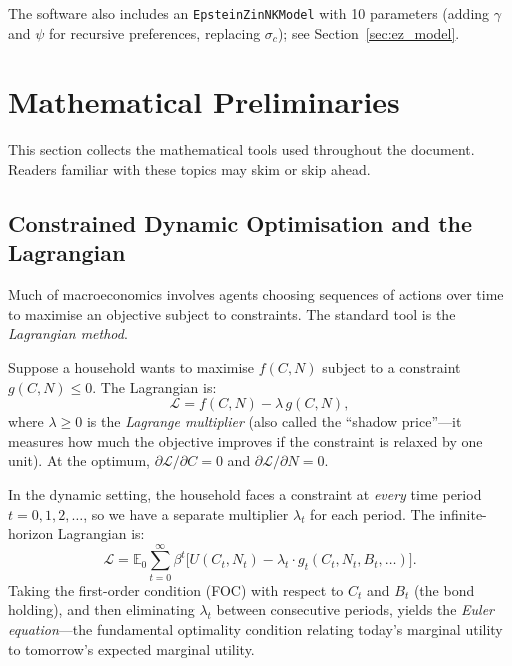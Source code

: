 \documentclass[11pt,a4paper]{article}
\theoremstyle{definition}
\newcommand{\E}{\mathbb{E}}
\newcommand{\code}[1]{\texttt{\color{codecolor}#1}}
\begin{document}
	The software also includes an \code{EpsteinZinNKModel} with 10 parameters (adding $\gamma$ and $\psi$ for recursive preferences, replacing $\sigma_c$); see Section~\ref{sec:ez_model}.
	
	\section{Mathematical Preliminaries}
	\label{sec:math_prelim}
	
	This section collects the mathematical tools used throughout the document.
	Readers familiar with these topics may skim or skip ahead.
	
	\subsection{Constrained Dynamic Optimisation and the Lagrangian}
	\label{sec:lagrangian}
	
	Much of macroeconomics involves agents choosing sequences of actions over time to maximise an objective subject to constraints.
	The standard tool is the \emph{Lagrangian method}.
	
	Suppose a household wants to maximise $f(C, N)$ subject to a constraint $g(C, N) \leq 0$.
	The Lagrangian is:
	\begin{equation}\label{eq:lagrangian}
		\mathcal{L} = f(C, N) - \lambda \, g(C, N),
	\end{equation}
	where $\lambda \geq 0$ is the \emph{Lagrange multiplier} (also called the ``shadow price''---it measures how much the objective improves if the constraint is relaxed by one unit).
	At the optimum, $\partial \mathcal{L}/\partial C = 0$ and $\partial \mathcal{L}/\partial N = 0$.
	
	In the dynamic setting, the household faces a constraint at \emph{every} time period $t = 0, 1, 2, \ldots$, so we have a separate multiplier $\lambda_t$ for each period.
	The infinite-horizon Lagrangian is:
	\begin{equation}\label{eq:dynamic_lagrangian}
		\mathcal{L} = \E_0 \sum_{t=0}^{\infty} \beta^t \bigl[U(C_t, N_t) - \lambda_t \cdot g_t(C_t, N_t, B_t, \ldots)\bigr].
	\end{equation}
	Taking the first-order condition (FOC) with respect to $C_t$ and $B_t$ (the bond holding), and then eliminating $\lambda_t$ between consecutive periods, yields the \emph{Euler equation}---the fundamental optimality condition relating today's marginal utility to tomorrow's expected marginal utility.
	
\end{document}
